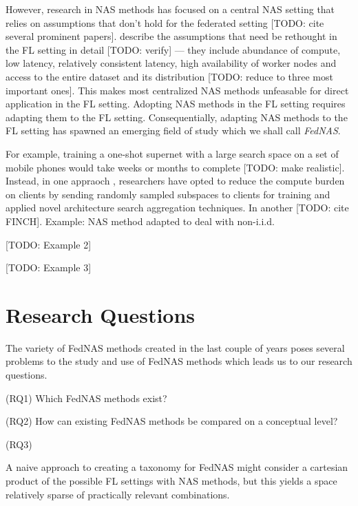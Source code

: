 However, research in NAS methods has focused on a central NAS setting that relies on assumptions that don't hold for the federated setting [TODO: cite several prominent papers]. \cite{fl_advances_and_open_problems_2021} describe the assumptions that need be rethought in the FL setting in detail [TODO: verify] — they include abundance of compute, low latency, relatively consistent latency, high availability of worker nodes and access to the entire dataset and its distribution [TODO: reduce to three most important ones]. This makes most centralized NAS methods unfeasable for direct application in the FL setting. Adopting NAS methods in the FL setting requires adapting them to the FL setting. Consequentially, adapting NAS methods to the FL setting has spawned an emerging field of study which we shall call \textit{FedNAS}.

For example, training a one-shot supernet with a large search space on a set of mobile phones would take weeks or months to complete [TODO: make realistic]. Instead, in one appraoch \cite{fedoras_2022}, researchers have opted to reduce the compute burden on clients by sending randomly sampled subspaces to clients for training and applied novel architecture search aggregation techniques. In another [TODO: cite FINCH].
Example: NAS method adapted to deal with non-i.i.d.

[TODO: Example 2]

[TODO: Example 3]

\section{Research Questions}

The variety of FedNAS methods created in the last couple of years poses several problems to the study and use of FedNAS methods which leads us to our research questions.

(RQ1) Which FedNAS methods exist? 

(RQ2) How can existing FedNAS methods be compared on a conceptual level?

(RQ3)


A naive approach to creating a taxonomy for FedNAS might consider a cartesian product of the possible FL settings with NAS methods, but this yields a space relatively sparse of practically relevant combinations.

